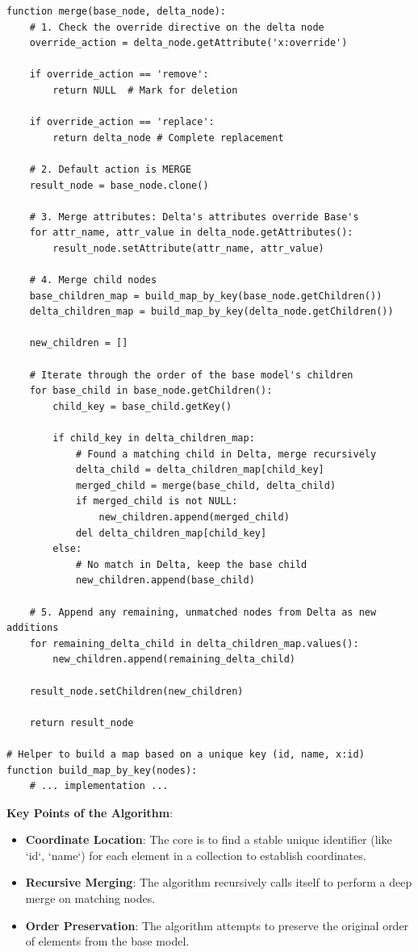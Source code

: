 \documentclass[11pt]{article}
\begin{document}
\begin{lstlisting}[language=PythonPseudocode, caption={Simplified Delta Merge Algorithm}]
function merge(base_node, delta_node):
    # 1. Check the override directive on the delta node
    override_action = delta_node.getAttribute('x:override')

    if override_action == 'remove':
        return NULL  # Mark for deletion
    
    if override_action == 'replace':
        return delta_node # Complete replacement

    # 2. Default action is MERGE
    result_node = base_node.clone()

    # 3. Merge attributes: Delta's attributes override Base's
    for attr_name, attr_value in delta_node.getAttributes():
        result_node.setAttribute(attr_name, attr_value)

    # 4. Merge child nodes
    base_children_map = build_map_by_key(base_node.getChildren())
    delta_children_map = build_map_by_key(delta_node.getChildren())

    new_children = []
    
    # Iterate through the order of the base model's children
    for base_child in base_node.getChildren():
        child_key = base_child.getKey()
        
        if child_key in delta_children_map:
            # Found a matching child in Delta, merge recursively
            delta_child = delta_children_map[child_key]
            merged_child = merge(base_child, delta_child)
            if merged_child is not NULL:
                new_children.append(merged_child)
            del delta_children_map[child_key]
        else:
            # No match in Delta, keep the base child
            new_children.append(base_child)
            
    # 5. Append any remaining, unmatched nodes from Delta as new additions
    for remaining_delta_child in delta_children_map.values():
        new_children.append(remaining_delta_child)
    
    result_node.setChildren(new_children)
    
    return result_node

# Helper to build a map based on a unique key (id, name, x:id)
function build_map_by_key(nodes):
    # ... implementation ...
\end{lstlisting}

\textbf{Key Points of the Algorithm}:
\begin{itemize}
    \item \textbf{Coordinate Location}: The core is to find a stable unique identifier (like `id`, `name`) for each element in a collection to establish coordinates.
    \item \textbf{Recursive Merging}: The algorithm recursively calls itself to perform a deep merge on matching nodes.
    \item \textbf{Order Preservation}: The algorithm attempts to preserve the original order of elements from the base model.
\end{itemize}
\end{document}
